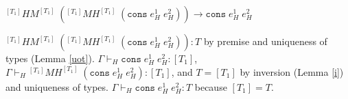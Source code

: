 \begin{case}
$^{[T_{1}]}HM^{[T_{1}]}\;(^{[T_{1}]}MH^{[T_{1}]}\;(\mathtt{cons}\;e_{H}^{1}\;e_{H}^{2}))\rightarrow\mathtt{cons}\;e_{H}^{1}\;e_{H}^{2}$

$^{[T_{1}]}HM^{[T_{1}]}\;(^{[T_{1}]}MH^{[T_{1}]}\;(\mathtt{cons}\;e_{H}^{1}\;e_{H}^{2})):T$ by premise and uniqueness of types (Lemma \ref{uot}).  $\Gamma\vdash_{H}\mathtt{cons}\;e_{H}^{1}\;e_{H}^{2}:[T_{1}]$, $\Gamma\vdash_{H}{^{[T_{1}]}M}H^{[T_{1}]}\;(\mathtt{cons}\;e_{H}^{1}\;e_{H}^{2}):[T_{1}]$, and $T=[T_{1}]$ by inversion (Lemma \ref{i}) and uniqueness of types.  $\Gamma\vdash_{H}\mathtt{cons}\;e_{H}^{1}\;e_{H}^{2}:T$ because $[T_{1}]=T$.
\end{case}